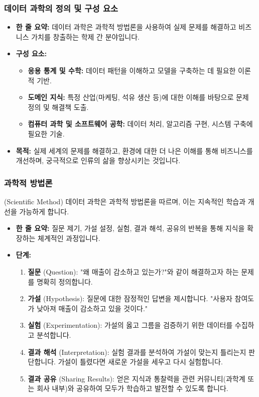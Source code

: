 \documentclass[11pt,a4paper]{article}
\theoremstyle{definition}
\begin{document}
\subsubsection*{데이터 과학의 정의 및 구성 요소}
\begin{itemize}
    \item \textbf{한 줄 요약:} 데이터 과학은 과학적 방법론을 사용하여 실제 문제를 해결하고 비즈니스 가치를 창출하는 학제 간 분야입니다.
    \item \textbf{구성 요소:}
    \begin{itemize}
        \item \textbf{응용 통계 및 수학:} 데이터 패턴을 이해하고 모델을 구축하는 데 필요한 이론적 기반.
        \item \textbf{도메인 지식:} 특정 산업(마케팅, 석유 생산 등)에 대한 이해를 바탕으로 문제 정의 및 해결책 도출.
        \item \textbf{컴퓨터 과학 및 소프트웨어 공학:} 데이터 처리, 알고리즘 구현, 시스템 구축에 필요한 기술.
    \end{itemize}
    \item \textbf{목적:} 실제 세계의 문제를 해결하고, 환경에 대한 더 나은 이해를 통해 비즈니스를 개선하며, 궁극적으로 인류의 삶을 향상시키는 것입니다.
\end{itemize}

\subsubsection*{과학적 방법론} (Scientific Method)
데이터 과학은 과학적 방법론을 따르며, 이는 지속적인 학습과 개선을 가능하게 합니다.
\begin{itemize}
    \item \textbf{한 줄 요약:} 질문 제기, 가설 설정, 실험, 결과 해석, 공유의 반복을 통해 지식을 확장하는 체계적인 과정입니다.
    \item \textbf{단계:}
    \begin{enumerate}
        \item \textbf{질문} (Question): "왜 매출이 감소하고 있는가?"와 같이 해결하고자 하는 문제를 명확히 정의합니다.
        \item \textbf{가설} (Hypothesis): 질문에 대한 잠정적인 답변을 제시합니다. "사용자 참여도가 낮아져 매출이 감소하고 있을 것이다."
        \item \textbf{실험} (Experimentation): 가설의 옳고 그름을 검증하기 위한 데이터를 수집하고 분석합니다.
        \item \textbf{결과 해석} (Interpretation): 실험 결과를 분석하여 가설이 맞는지 틀리는지 판단합니다. 가설이 틀렸다면 새로운 가설을 세우고 다시 실험합니다.
        \item \textbf{결과 공유} (Sharing Results): 얻은 지식과 통찰력을 관련 커뮤니티(과학계 또는 회사 내부)와 공유하여 모두가 학습하고 발전할 수 있도록 합니다.
    \end{enumerate}
\end{itemize}
\end{document}
